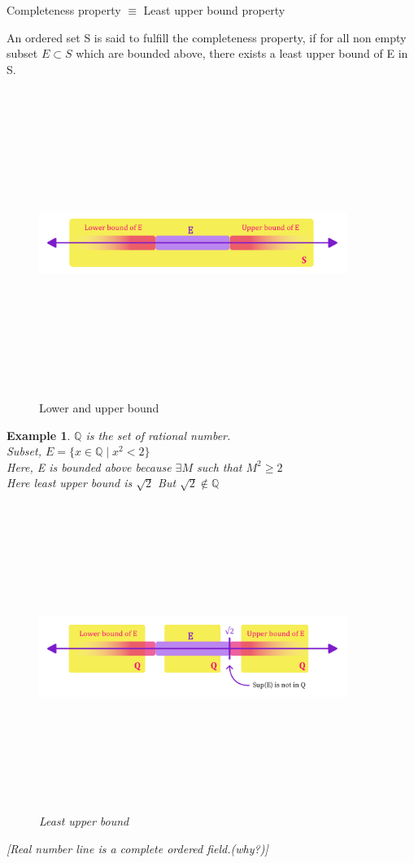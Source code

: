 \documentclass{article}
\newtheorem{example}{Example}[section]
\begin{document}
\begin{flushleft}\large{Completeness property $\equiv $ Least upper bound property}\end{flushleft}
An ordered set S is said to fulfill the completeness property, if for all non empty subset $E\subset S$ which are bounded above, there exists a least upper bound of E in S.\\
\begin{figure}[H]
    \centering
    \includegraphics [width=10cm,height=10cm,keepaspectratio]{tex graphs-12.png}
    \caption{Lower and upper bound}
\end{figure}
\begin{example}
    $\mathbb{Q}$ is the set of rational number.\\
    Subset, $E=\{x\in\mathbb{Q}\;|\;x^2<2\}$\\
    Here, E is bounded above because $\exists M$ such that $M^2\geq2$\\
    Here least upper bound is $\sqrt{2}$ But $\sqrt{2} \notin \mathbb{Q}$
    \begin{figure}[H]
    \centering
    \includegraphics [width=10cm,height=10cm,keepaspectratio]{tex graphs-13.png}
    \caption{Least upper bound}
\end{figure}
\end{example}
\textit{[Real number line is a complete ordered field.(why?)]}
\end{document}
